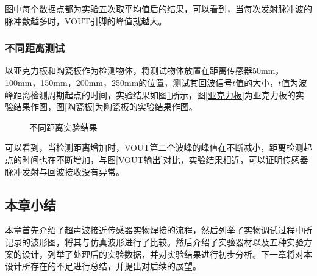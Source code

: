 图中每个数据点都为实验五次取平均值后的结果，可以看到，当每次发射脉冲波的脉冲数越多时，VOUT引脚的峰值就越大。

\subsubsection{不同距离测试}
以亚克力板和陶瓷板作为检测物体，将测试物体放置在距离传感器50mm，100mm，150mm，200mm，250mm的位置，测试其回波信号$t$值的大小，$t$值为波峰距离检测周期起点的时间，实验结果如图\ref{不同距离实验结果}所示，图\ref{亚克力板}为亚克力板的实验结果作图，图\ref{陶瓷板}为陶瓷板的实验结果作图。
\begin{figure}[!h]
	\centering
	\caption{不同距离实验结果}
	\label{不同距离实验结果}
\end{figure}\par
可以看到，当检测距离增加时，VOUT第二个波峰的峰值在不断减小，距离检测起点的时间也在不断增加，与图\ref{VOUT输出}对比，实验结果相近，可以证明传感器脉冲发射与回波接收没有异常。
\subsection{本章小结}
本章首先介绍了超声波接近传感器实物焊接的流程，然后列举了实物调试过程中所记录的波形图，将其与仿真波形进行了比较。然后介绍了实验器材以及五种实验方案的设计，列举了处理后的实验数据，并对实验结果进行初步分析。下一章将对本设计所存在的不足进行总结，并提出对后续的展望。







